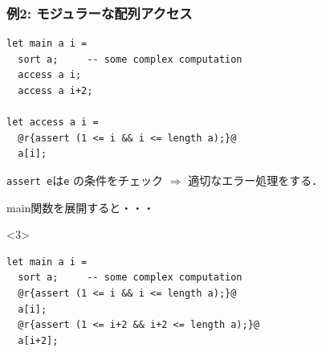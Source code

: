 \documentclass[dvipdfmx,cjk,xcolor=dvipsnames,envcountsect,notheorems,12pt]{beamer}
\theoremstyle{definition}
\begin{document}


\begin{frame}[fragile]
  \frametitle{例2: モジュラーな配列アクセス}
\begin{lstlisting}
let main a i =
  sort a;     -- some complex computation
  access a i;
  access a i+2;

let access a i =
  @r{assert (1 <= i && i <= length a);}@
  a[i];
\end{lstlisting}
  \lstinline|assert e|は\lstinline|e| の条件をチェック $\Rightarrow$ 適切なエラー処理をする． %

  \pause
  main関数を展開すると・・・


  \begin{onlyenv}<3>
\begin{lstlisting}
let main a i =
  sort a;     -- some complex computation
  @r{assert (1 <= i && i <= length a);}@
  a[i];
  @r{assert (1 <= i+2 && i+2 <= length a);}@
  a[i+2];
\end{lstlisting}
  \end{onlyenv}

\end{frame}
\end{document}
